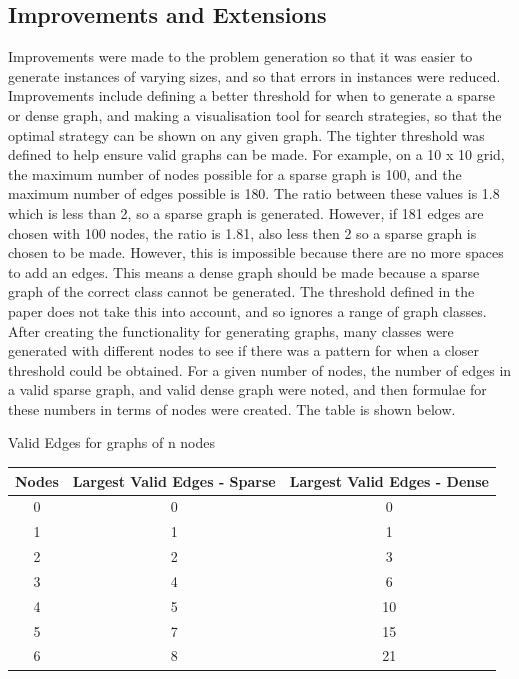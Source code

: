 \documentclass{article}
\begin{document}
\subsection{Improvements and Extensions}
Improvements were made to the problem generation so that it was easier to generate instances of varying sizes, and so that errors in instances were reduced. Improvements include defining a better threshold for when to generate a sparse or dense graph, and making a visualisation tool for search strategies, so that the optimal strategy can be shown on any given graph. 
The tighter threshold was defined to help ensure valid graphs can be made. For example, on a 10 x 10 grid, the maximum number of nodes possible for a sparse graph is 100, and the maximum number of edges possible is 180. The ratio between these values is 1.8 which is less than 2, so a sparse graph is generated. However, if 181 edges are chosen with 100 nodes, the ratio is 1.81, also less then 2 so a sparse graph is chosen to be made. However, this is impossible because there are no more spaces to add an edges. This means a dense graph should be made because a sparse graph of the correct class cannot be generated.
 The threshold defined in the paper does not take this into account, and so ignores a range of graph classes. After creating the functionality for generating graphs, many classes were generated with different nodes to see if there was a pattern for when a closer threshold could be obtained. For a given number of nodes, the number of edges in a valid sparse graph, and valid dense graph were noted, and then formulae for these numbers in terms of nodes were created. The table is shown below.

\begin{table}
    Valid Edges for graphs of n nodes\\
    \begin{tabular}{ |c|c|c| }
    \hline
    Nodes & Largest Valid Edges - Sparse  & Largest Valid Edges - Dense\\
    \hline
    0 & 0 & 0 \\ \hline
    1 & 1 & 1 \\ \hline
    2 & 2 & 3 \\ \hline
    3 & 4 & 6 \\ \hline
    4 & 5 & 10 \\ \hline
    5 & 7 & 15\\ \hline
    6 & 8 & 21 \\ \hline
    \end{tabular}
    \end{table}
\end{document}
